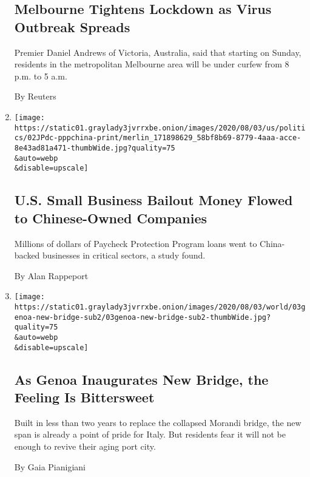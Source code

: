 \begin{enumerate}
  \hypertarget{melbourne-tightens-lockdown-as-virus-outbreak-spreads}{%
  \subsection{Melbourne Tightens Lockdown as Virus Outbreak
  Spreads}\label{melbourne-tightens-lockdown-as-virus-outbreak-spreads}}

  Premier Daniel Andrews of Victoria, Australia, said that starting on
  Sunday, residents in the metropolitan Melbourne area will be under
  curfew from 8 p.m. to 5 a.m.

  By Reuters
\item
  \href{/2020/08/02/us/politics/virus-china-ppp-small-business-loans.html}{}

  \texttt{[image: https://static01.graylady3jvrrxbe.onion/images/2020/08/03/us/politics/02JPdc-pppchina-print/merlin\_171898629\_58bf8b69-8779-4aaa-acce-8e43ad81a471-thumbWide.jpg?quality=75\\\&auto=webp\\\&disable=upscale]}

  \hypertarget{us-small-business-bailout-money-flowed-to-chinese-owned-companies}{%
  \subsection{U.S. Small Business Bailout Money Flowed to Chinese-Owned
  Companies}\label{us-small-business-bailout-money-flowed-to-chinese-owned-companies}}

  Millions of dollars of Paycheck Protection Program loans went to
  China-backed businesses in critical sectors, a study found.

  By Alan Rappeport
\item
  \href{/2020/08/02/world/europe/genoa-Morandi-bridge-replacement.html}{}

  \texttt{[image: https://static01.graylady3jvrrxbe.onion/images/2020/08/03/world/03genoa-new-bridge-sub2/03genoa-new-bridge-sub2-thumbWide.jpg?quality=75\\\&auto=webp\\\&disable=upscale]}

  \hypertarget{as-genoa-inaugurates-new-bridge-the-feeling-is-bittersweet}{%
  \subsection{As Genoa Inaugurates New Bridge, the Feeling Is
  Bittersweet}\label{as-genoa-inaugurates-new-bridge-the-feeling-is-bittersweet}}

  Built in less than two years to replace the collapsed Morandi bridge,
  the new span is already a point of pride for Italy. But residents fear
  it will not be enough to revive their aging port city.

  By Gaia Pianigiani
\end{enumerate}

